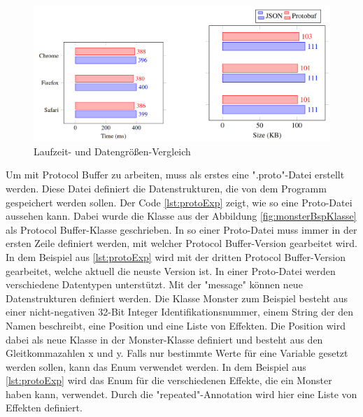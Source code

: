 \begin{figure}[htp]
    \centering
    \includegraphics[width=1\textwidth]{images/protobuf_browser.png}
    \caption{Laufzeit- und Datengrößen-Vergleich\cite{currier2022protocol}}
    \label{fig:protobufBrowser}
\end{figure}

Um mit Protocol Buffer zu arbeiten, muss als erstes eine ".proto"-Datei erstellt werden. Diese Datei definiert die Datenstrukturen, die von dem Programm gespeichert werden sollen. Der Code \ref{lst:protoExp} zeigt, wie so eine Proto-Datei aussehen kann. Dabei wurde die Klasse aus der Abbildung \ref{fig:monsterBspKlasse} als Protocol Buffer-Klasse geschrieben. In so einer Proto-Datei muss immer in der ersten Zeile definiert werden, mit welcher Protocol Buffer-Version gearbeitet wird. In dem Beispiel aus \ref{lst:protoExp} wird mit der dritten Protocol Buffer-Version gearbeitet, welche aktuell die neuste Version ist. In einer Proto-Datei werden verschiedene Datentypen unterstützt. Mit der "message" können neue Datenstrukturen definiert werden. Die Klasse Monster zum Beispiel besteht aus einer nicht-negativen 32-Bit Integer Identifikationsnummer, einem String der den Namen beschreibt, eine Position und eine Liste von Effekten. Die Position wird dabei als neue Klasse in der Monster-Klasse definiert und besteht aus den Gleitkommazahlen x und y. Falls nur bestimmte Werte für eine Variable gesetzt werden sollen, kann das Enum verwendet werden. In dem Beispiel aus \ref{lst:protoExp} wird das Enum für die verschiedenen Effekte, die ein Monster haben kann, verwendet. Durch die "repeated"-Annotation wird hier eine Liste von Effekten definiert.\cite{protobufLanguageGuide}\cite{protobufProtocolBufferJava}

